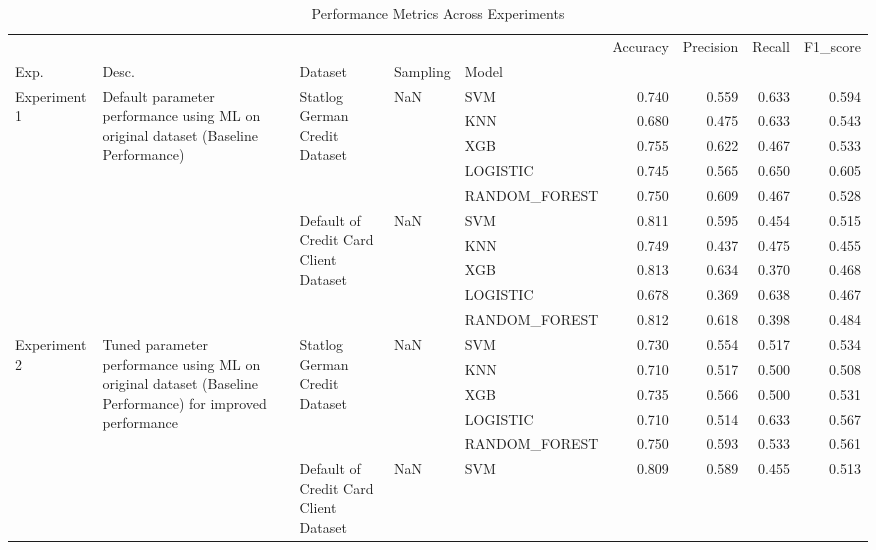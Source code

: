 \begin{table}
\caption{Performance Metrics Across Experiments}
\label{tab:results}
\begin{tabular}{lllllrrrr}
\toprule
 &  &  &  &  & Accuracy & Precision & Recall & F1\_score \\
Exp. & Desc. & Dataset & Sampling & Model &  &  &  &  \\
\midrule
\multirow[t]{10}{*}{Experiment 1} & \multirow[t]{10}{*}{Default parameter performance using ML on original dataset (Baseline Performance)} & \multirow[t]{5}{*}{Statlog German Credit Dataset} & \multirow[t]{5}{*}{NaN} & SVM & 0.740 & 0.559 & 0.633 & 0.594 \\
 &  &  &  & KNN & 0.680 & 0.475 & 0.633 & 0.543 \\
 &  &  &  & XGB & 0.755 & 0.622 & 0.467 & 0.533 \\
 &  &  &  & LOGISTIC & 0.745 & 0.565 & 0.650 & 0.605 \\
 &  &  &  & RANDOM\_FOREST & 0.750 & 0.609 & 0.467 & 0.528 \\
\cline{3-9} \cline{4-9}
 &  & \multirow[t]{5}{*}{Default of Credit Card Client Dataset} & \multirow[t]{5}{*}{NaN} & SVM & 0.811 & 0.595 & 0.454 & 0.515 \\
 &  &  &  & KNN & 0.749 & 0.437 & 0.475 & 0.455 \\
 &  &  &  & XGB & 0.813 & 0.634 & 0.370 & 0.468 \\
 &  &  &  & LOGISTIC & 0.678 & 0.369 & 0.638 & 0.467 \\
 &  &  &  & RANDOM\_FOREST & 0.812 & 0.618 & 0.398 & 0.484 \\
\cline{1-9} \cline{2-9} \cline{3-9} \cline{4-9}
\multirow[t]{10}{*}{Experiment 2} & \multirow[t]{10}{*}{Tuned parameter performance using ML on original dataset (Baseline Performance) for improved performance} & \multirow[t]{5}{*}{Statlog German Credit Dataset} & \multirow[t]{5}{*}{NaN} & SVM & 0.730 & 0.554 & 0.517 & 0.534 \\
 &  &  &  & KNN & 0.710 & 0.517 & 0.500 & 0.508 \\
 &  &  &  & XGB & 0.735 & 0.566 & 0.500 & 0.531 \\
 &  &  &  & LOGISTIC & 0.710 & 0.514 & 0.633 & 0.567 \\
 &  &  &  & RANDOM\_FOREST & 0.750 & 0.593 & 0.533 & 0.561 \\
\cline{3-9} \cline{4-9}
 &  & \multirow[t]{5}{*}{Default of Credit Card Client Dataset} & \multirow[t]{5}{*}{NaN} & SVM & 0.809 & 0.589 & 0.455 & 0.513 \\

\end{tabular}
\end{table}
